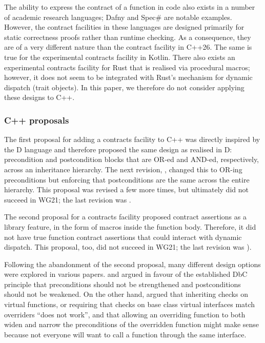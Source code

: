 The ability to express the contract of a function in code also exists in a number of academic research languages; Dafny and Spec\# are notable examples. However, the contract facilities in these languages are designed primarily for static correctness proofs rather than runtime checking. As a consequence, they are of a very different nature than the contract facility in C++26. The same is true for the experimental contracts facility in Kotlin. There also exists an experimental contracts facility for Rust that is realised via procedural macros; however, it does not seem to be integrated with Rust's mechanism for dynamic dispatch (trait objects). In this paper, we therefore do not consider applying these designs to C++.

\subsubsection{C++ proposals}

The first proposal for adding a contracts facility to C++ \cite{N1613} was directly inspired by the D language and therefore proposed the same design as realised in D: precondition and postcondition blocks that are OR-ed and AND-ed, respectively, across an inheritance hierarchy. The next revision, \cite{N1669}, changed this to OR-ing preconditions but enforcing that postconditions are the same across the entire hierarchy.
This proposal was revised a few more times, but ultimately did not succeed in WG21; the last revision was \cite{N1962}.

The second proposal for a contracts facility \cite{N3604} proposed contract assertions as a library feature, in the form of macros inside the function body. Therefore, it did not have true function contract assertions that could interact with dynamic dispatch. This proposal, too, did not succeed in WG21; the last revision was \cite{N4378}).

Following the abandonment of the second proposal, many different design options were explored in various papers. \cite{N4110} and \cite{P0147R0} argued in favour of the established DbC principle that preconditions should not be strengthened and postconditions should not be weakened. On the other hand, \cite{P0247R0} argued that inheriting checks on virtual functions, or requiring that checks on base class virtual interfaces match overriders ``does not work'', and that allowing an overriding function to both widen and narrow the preconditions of the overridden function might make sense because not everyone will want to call a function through the same interface.

